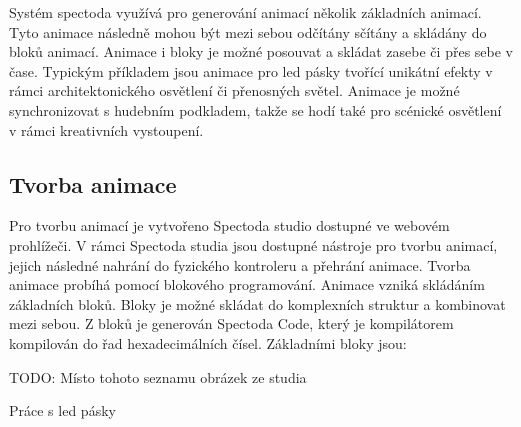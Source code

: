Systém spectoda využívá pro generování animací několik základních animací. Tyto animace následně mohou být mezi sebou odčítány sčítány a skládány do bloků animací. Animace i bloky je možné posouvat a skládat zasebe či přes sebe v čase. Typickým příkladem jsou animace pro led pásky tvořící unikátní efekty v rámci architektonického osvětlení či přenosných světel. Animace je možné synchronizovat s hudebním podkladem, takže se hodí také pro scénické osvětlení v rámci kreativních vystoupení. 

\subsection{Tvorba animace}

Pro tvorbu animací je vytvořeno Spectoda studio \cite{Spectoda} dostupné ve webovém prohlížeči. V rámci Spectoda studia jsou dostupné nástroje pro tvorbu animací, jejich následné nahrání do fyzického kontroleru a přehrání animace. Tvorba animace probíhá pomocí blokového programování. Animace vzniká skládáním základních bloků. Bloky je možné skládat do komplexních struktur a kombinovat mezi sebou. Z bloků je generován Spectoda Code, který je kompilátorem kompilován do řad hexadecimálních čísel. Základními bloky jsou:

TODO: Místo tohoto seznamu obrázek ze studia
\begin{description}
  \item []
  \item []
  \item []
  \item []
  \item []
  \item []
  \item []
\end{description}



Práce s led pásky
 
